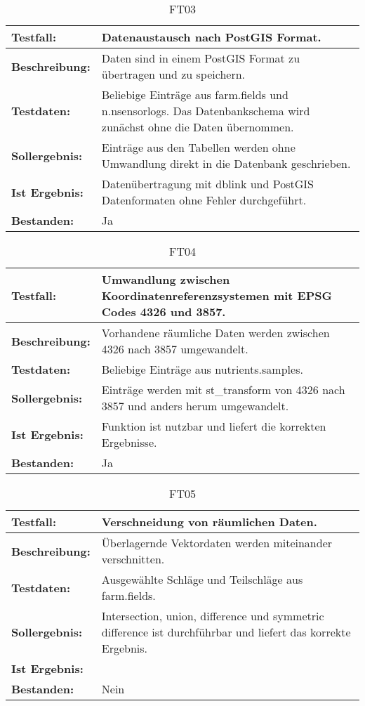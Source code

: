 \begin{table}[h!]
\centering
\small
\begin{tabular}{p{2.8cm}|p{12cm}}
\textbf{Testfall:} & Datenaustausch nach PostGIS Format. \\ \hline
\textbf{Beschreibung:} & Daten sind in einem PostGIS Format zu übertragen und zu speichern. \\ \hline
\textbf{Testdaten:} & Beliebige Einträge aus farm.fields und n.nsensorlogs. Das Datenbankschema wird zunächst ohne die Daten übernommen. \\ \hline
\textbf{Sollergebnis:} & Einträge aus den Tabellen werden ohne Umwandlung direkt in die Datenbank geschrieben. \\ \hline
\textbf{Ist Ergebnis:} & Datenübertragung mit dblink und PostGIS Datenformaten ohne Fehler durchgeführt. \\ \hline
\textbf{Bestanden:} & Ja \\
\end{tabular}
\caption*{FT03}
\end{table}

\begin{table}[h!]
\centering
\small
\begin{tabular}{p{2.8cm}|p{12cm}}
\textbf{Testfall:} & Umwandlung zwischen Koordinatenreferenzsystemen mit EPSG Codes 4326 und 3857. \\ \hline
\textbf{Beschreibung:} & Vorhandene räumliche Daten werden zwischen 4326 nach 3857 umgewandelt. \\ \hline
\textbf{Testdaten:} & Beliebige Einträge aus nutrients.samples. \\ \hline
\textbf{Sollergebnis:} & Einträge werden mit st\_{}transform von 4326 nach 3857 und anders herum umgewandelt. \\ \hline
\textbf{Ist Ergebnis:} & Funktion ist nutzbar und liefert die korrekten Ergebnisse. \\ \hline
\textbf{Bestanden:} & Ja \\
\end{tabular}
\caption*{FT04}
\end{table}

\begin{table}[h!]
\centering
\small
\begin{tabular}{p{2.8cm}|p{12cm}}
\textbf{Testfall:} & Verschneidung von räumlichen Daten. \\ \hline
\textbf{Beschreibung:} & Überlagernde Vektordaten werden miteinander verschnitten. \\ \hline
\textbf{Testdaten:} & Ausgewählte Schläge und Teilschläge aus farm.fields. \\ \hline
\textbf{Sollergebnis:} & Intersection, union, difference und symmetric difference ist durchführbar und liefert das korrekte Ergebnis. \\ \hline
\textbf{Ist Ergebnis:} &  \\ \hline %
\textbf{Bestanden:} & Nein \\
\end{tabular}
\caption*{FT05}
\end{table}

